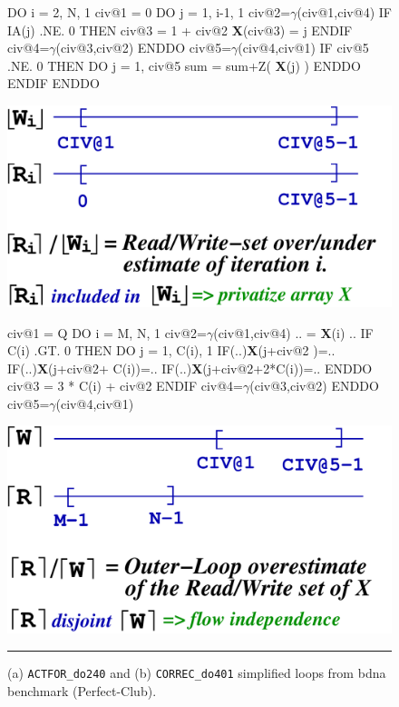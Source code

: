 \documentclass{sig-alternate}
\newcommand{\mymath}[1]{$ #1 $}
\begin{document}
\begin{figure}
\begin{minipage}{0.45\columnwidth}
\begin{colorcode}
DO i = 2, N, 1
 civ@1 = 0
 DO j = 1, i-1, 1
  civ@2=\mymath{\gamma}(civ@1,civ@4)
  IF IA(j) .NE. 0 THEN
   civ@3 = 1 + civ@2
   {\bf{}X}(civ@3) = j
  ENDIF
  civ@4=\mymath{\gamma}(civ@3,civ@2)
 ENDDO
 civ@5=\mymath{\gamma}(civ@4,civ@1)
 IF civ@5 .NE. 0 THEN
  DO j = 1, civ@5
   sum = sum+Z( {\bf{}X}(j) )
ENDDO ENDIF ENDDO
\end{colorcode}
\includegraphics[width=1.1\textwidth]{Figures/ActforRWsets} 
\end{minipage}
\begin{minipage}{0.48\columnwidth}
\begin{colorcode}
civ@1 = Q
DO i = M, N, 1
 civ@2=\mymath{\gamma}(civ@1,civ@4)
 .. = {\bf X}(i) ..
 IF C(i) .GT. 0 THEN
  DO j = 1, C(i), 1
   IF(..){\bf{}X}(j+civ@2       )=..
   IF(..){\bf{}X}(j+civ@2+  C(i))=..
   IF(..){\bf{}X}(j+civ@2+2*C(i))=..
  ENDDO
  civ@3 = 3 * C(i) + civ@2
 ENDIF
 civ@4=\mymath{\gamma}(civ@3,civ@2)
ENDDO
civ@5=\mymath{\gamma}(civ@4,civ@1)  
\end{colorcode}
\hspace{2ex}\includegraphics[width=1\textwidth]{Figures/CorrecRWsets} 
\end{minipage}
\hrule
\caption{(a) {\tt ACTFOR\_do240} and (b) {\tt CORREC\_do401} simplified loops 
            from {\sc bdna} benchmark ({\sc Perfect-Club}).}
\label{fig:codeActforCorrec}
\end{figure}
\end{document}
